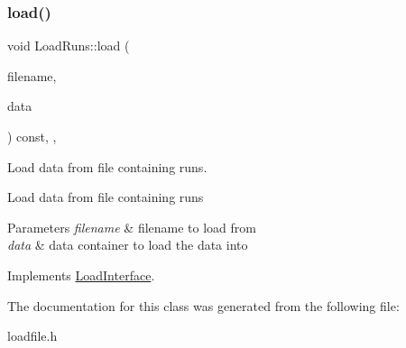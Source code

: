 \subsubsection{\texorpdfstring{load()}{load()}}
{\footnotesize\ttfamily void Load\+Runs\+::load (\begin{DoxyParamCaption}\item[{std\+::string}]{filename,  }\item[{\mbox{\hyperlink{classFileDataContainer}{File\+Data\+Container}} $\ast$}]{data }\end{DoxyParamCaption}) const\hspace{0.3cm}{\ttfamily [inline]}, {\ttfamily [override]}, {\ttfamily [virtual]}}



Load data from file containing runs. 

Load data from file containing runs 
\begin{DoxyParams}{Parameters}
{\em filename} & filename to load from \\
\hline
{\em data} & data container to load the data into \\
\hline
\end{DoxyParams}


Implements \mbox{\hyperlink{classLoadInterface_a91bdc01550e64219c4007afce054fd40}{Load\+Interface}}.



The documentation for this class was generated from the following file\+:\begin{DoxyCompactItemize}
\item 
loadfile.\+h\end{DoxyCompactItemize}
